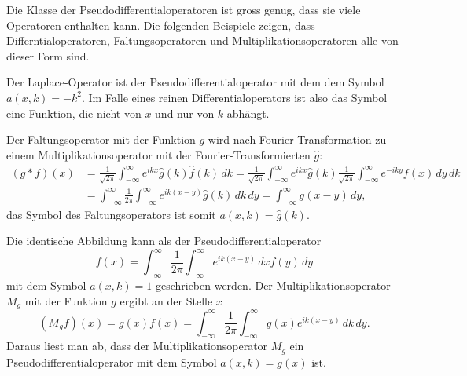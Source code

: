 Die Klasse der Pseudodifferentialoperatoren ist gross genug, dass sie
viele Operatoren enthalten kann.
Die folgenden Beispiele zeigen, dass Differntialoperatoren,
Faltungsoperatoren und Multiplikationsoperatoren alle von dieser
Form sind.

\begin{beispiel}
Der Laplace-Operator ist der Pseudodifferentialoperator mit dem
dem Symbol
\(
a(x,k)=
-k^2
\).
Im Falle eines reinen Differentialoperators ist also das Symbol eine 
Funktion, die nicht von $x$ und nur von $k$ abhängt.
\end{beispiel}

\begin{beispiel}
Der Faltungsoperator mit der Funktion $g$ wird nach Fourier-Transformation
zu einem Multiplikationsoperator mit der Fourier-Transformierten $\hat{g}$:
\begin{align*}
(g * f)(x)
&=
\frac{1}{\!\sqrt{2\pi}}
\int_{-\infty}^\infty e^{ikx} \hat{g}(k) \hat{f}(k) \,dk
=
\frac{1}{\!\sqrt{2\pi}}
\int_{-\infty}^\infty
e^{ikx}
\hat{g}(k) 
\frac{1}{\!\sqrt{2\pi}}
\int_{-\infty}^\infty
e^{-iky}
f(x)
\,dy
\,dk
\\
&=
\int_{-\infty}^\infty
\frac{1}{2\pi}
\int_{-\infty}^\infty
e^{ik(x-y)}
\hat{g}(k)
\,dk
\,dy
=
\int_{-\infty}^\infty
g(x-y)
\,dy,
\end{align*}
das Symbol des Faltungsoperators ist somit $a(x,k)=\hat{g}(k)$.
\end{beispiel}

\begin{beispiel}
Die identische Abbildung kann als der Pseudodifferentialoperator
\[
f(x)
=
\int_{-\infty}^\infty 
\frac{1}{2\pi}
\int_{-\infty}^\infty 
e^{ik(x-y)}
\,dx
f(y)
\,dy
\]
mit dem Symbol $a(x,k)=1$ geschrieben werden.
Der Multiplikationsoperator $M_g$ mit der Funktion $g$ ergibt an
der Stelle $x$
\[
(M_gf)(x)
=
g(x) f(x)
=
\int_{-\infty}^\infty
\frac{1}{2\pi}
\int_{-\infty}^\infty
g(x) e^{ik(x-y)}
\,dk
\,dy.
\]
Daraus liest man ab, dass der Multiplikationsoperator $M_g$ ein
Pseudodifferentialoperator mit dem Symbol $a(x,k)=g(x)$ ist.
\end{beispiel}




